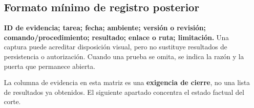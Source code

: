 \subsection*{Formato mínimo de registro posterior}
\textbf{ID de evidencia; tarea; fecha; ambiente; versión o revisión; comando/procedimiento; resultado; enlace o ruta; limitación.} Una captura puede acreditar disposición visual, pero no sustituye resultados de persistencia o autorización. Cuando una prueba se omita, se indica la razón y la puerta que permanece abierta.

La columna de evidencia en esta matriz es una \textbf{exigencia de cierre}, no una lista de resultados ya obtenidos. El siguiente apartado concentra el estado factual del corte.
